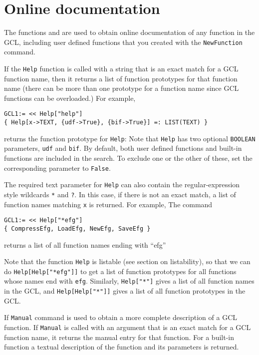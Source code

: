 \section{Online documentation}

The functions  and  are used to obtain online
documentation of any function in the GCL, including user defined
functions that you created with the \verb+NewFunction+ command. 

If the \verb+Help+ function is called with a string that is an exact
match for a GCL function name, then it returns a list of function
prototypes for that function name (there can be more than one
prototype for a function name since GCL functions can be overloaded.)
For example,

\begin{verbatim}
GCL1:= << Help["help"]
{ Help[x->TEXT, {udf->True}, {bif->True}] =: LIST(TEXT) }
\end{verbatim}

\noindent
returns the function prototype for \verb+Help+: Note that \verb+Help+
has two optional \verb+BOOLEAN+ parameters, \verb+udf+ and \verb+bif+.
By default, both user defined functions and built-in functions are
included in the search.  To exclude one or the other of these, set the
corresponding parameter to \verb+False+.

The required text parameter for \verb+Help+ can also contain the
regular-expression style wildcards \verb+*+ and \verb+?+.  In this
case, if there is not an exact match, a list of function names
matching \verb+x+ is returned.  For example, The command 

\begin{verbatim}
GCL1:= << Help["*efg"]
{ CompressEfg, LoadEfg, NewEfg, SaveEfg }
\end{verbatim}

\noindent
returns a list of all function names ending with ``efg''

Note that the function \verb+Help+ is listable (see section on
listability), so that we can do \verb+Help[Help["*efg"]]+ to get a
list of function prototypes for all functions whose names end with
\verb+efg+.  Similarly, \verb+Help["*"]+ gives a list of all function
names in the GCL, and {\tt Help[Help["*"]]} gives a list of all
function prototypes in the GCL.

If \verb+Manual+ command is used to obtain a more complete description
of a GCL function.  If \verb+Manual+ is called with an argument that
is an exact match for a GCL function name, it returns the manual entry
for that function.  For a built-in function a textual description of
the function and its parameters is returned. 

